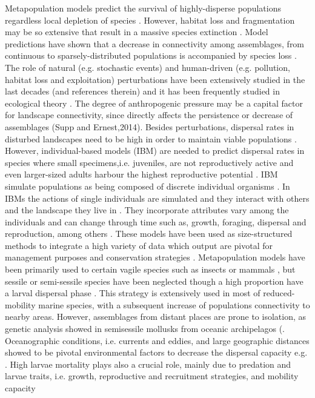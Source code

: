 \documentclass[12pt]{article}
\begin{document}
\begin{flushleft}
{{{{{Metapopulation models predict the survival of highly-disperse populations regardless local depletion of species \citep{hanski1999habitat,akccakaya2007role}. However, habitat loss and fragmentation may be so extensive that result in a massive species extinction \citep{montoya2008habitat,Rybicki and Hanksi,
2013,haddad2015habitat}. Model predictions have shown that a decrease in connectivity among assemblages, from continuous to sparsely-distributed populations is accompanied by species loss \citep{metzger2009time, niebuhr2015survival}. The role of natural (e.g. stochastic events) and human-driven (e.g. pollution, habitat loss and exploitation) perturbations have been extensively studied in the last decades (\citep{dornelas2010disturbance}and references therein) and it has been frequently studied in ecological theory \citep{volkov2007pattern, gardner2008spatial}. The degree of anthropogenic pressure may be a capital factor for landscape connectivity, since directly affects the persistence or decrease of assemblages (Supp and Ernest,2014). Besides perturbations, dispersal rates in disturbed landscapes need to be high in order to maintain viable populations \citep{provan2008high}. However, individual-based models (IBM) are needed to predict dispersal rates in species where small specimens,i.e. juveniles, are not reproductively active and even larger-sized adults harbour the highest reproductive potential \citep{hendriks2008scaling,  werner2011reproductive}. IBM simulate populations as being composed of discrete individual organisms \citep{deangelis2014individual, an2016predicting}. In IBMs the actions of single individuals are simulated and they interact with others and the landscape they live in \citep{deangelis2005individual}. They incorporate attributes vary among the individuals and can change through time such as, growth, foraging, dispersal and reproduction, among others \citep{martin2013predicting, deangelis2014individual}. These models have been used as size-structured methods to integrate a high variety of data which output are pivotal for management purposes \citep{punt2013review} and conservation strategies \citep{nabe2014effects}. Metapopulation models have been primarily used to certain vagile species such as insects \citep{harrison1995testing, hilker2006parameterizing}or mammals \citep{krohne1997dynamics, lawes2000patch}, but sessile or semi-sessile species have been neglected though a high proportion have a larval dispersal phase \citep{sale2006merging, gaggiotti2017metapopulations}. This strategy is extensively used in most of reduced-mobility marine species, with a subsequent increase of populations connectivity to nearby areas. However, assemblages from distant places are prone to isolation, as genetic analysis showed in semisessile mollusks from oceanic archipelagos (\citep{corte1996population, gaggiotti2017metapopulations, faria2017disentangling}. Oceanographic conditions, i.e. currents and eddies, and large geographic distances showed to be pivotal environmental factors to decrease the dispersal capacity e.g. \citep{palumbi1994genetic}. High larvae mortality plays also a crucial role, mainly due to predation and larvae traits, i.e. growth, reproductive and recruitment strategies, and mobility capacity \citep{cowen2000connectivity, }}}}}}
\end{flushleft}
\end{document}
